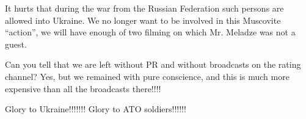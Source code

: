 It hurts that during the war from the Russian Federation such persons are
allowed into Ukraine.  We no longer want to be involved in this Muscovite
\enquote{action}, we will have enough of two filming on which Mr. Meladze was
not a guest.

Can you tell that we are left without PR and without broadcasts on the rating
channel? Yes, but we remained with pure conscience, and this is much more
expensive than all the broadcasts there!!!!

Glory to Ukraine!!!!!!! Glory to ATO soldiers!!!!!!
